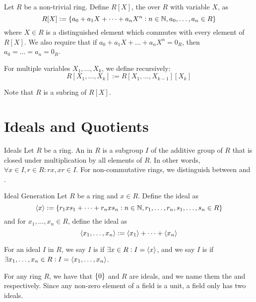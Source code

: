 \documentclass{styles/tufte}
\begin{document}
\begin{definition}{}{}
  Let $R$ be a non-trivial ring. Define $R[X]$, the  over $R$ with variable $X$, as
  \[ R[X] := \set{a_0 + a_1 X + \dots + a_n X^n: n \in \mathbb{N}, a_0, \dots, a_n \in R} \]
  where $X \in R$ is a distinguished element which commutes with every element of $R[X]$. We also require that if $a_0 + a_1 X + \dots + a_n X^n = 0_R$, then $a_0 = \dots = a_n = 0_R$.
  
  For multiple variables $X_1, \dots, X_k$, we define recursively:
  \[ R[X_1, \dots, X_k] := R[X_1, \dots, X_{k-1}][X_k]  \]
\end{definition}

Note that $R$ is a subring of $R[X]$.



\section{Ideals and Quotients}

\begin{definition}{Ideals}{}
  Let $R$ be a ring. An  in $R$ is a subgroup $I$ of the additive group of $R$ that is closed under multiplication by all elements of $R$. In other words, $\forall x \in I, r \in R: rx, xr \in I$. For non-commutative rings, we distinguish between  and .
\end{definition}

\begin{definition}{Ideal Generation}{}
  Let $R$ be a ring and $x \in R$. Define the ideal  as
  \[ \langle x \rangle := \set{r_1 x s_1 + \dots + r_n x s_n: n \in \mathbb{N}, r_1, \dots, r_n, s_1, \dots, s_n \in R} \]
  and for $x_1, \dots, x_n \in R$, define the ideal  as
  \[ \langle x_1, \dots, x_n \rangle := \langle x_1 \rangle + \dots + \langle x_n \rangle \]
  
  For an ideal $I$ in $R$, we say $I$ is  if $\exists x \in R: I = \langle x \rangle$, and we say $I$ is  if $\exists x_1, \dots, x_n \in R: I = \langle x_1, \dots, x_n \rangle$.
\end{definition}

For any ring $R$, we have that $\set{0}$ and $R$ are ideals, and we name them the  and  respectively. Since any non-zero element of a field is a unit, a field only has two ideals.
\end{document}
